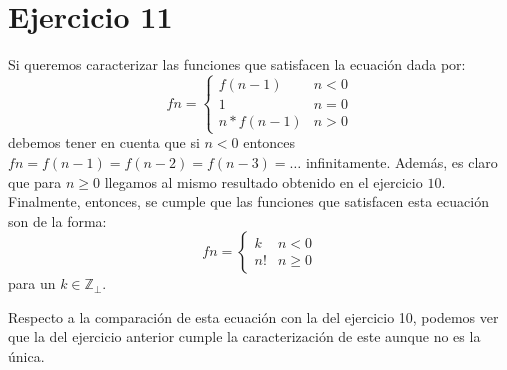 \documentclass{article}
\newcommand{\Z}{\mathbb{Z}}
\begin{document}
\section*{Ejercicio 11}
Si queremos caracterizar las funciones que satisfacen la ecuación dada por:
\begin{equation*}
	f n = \begin{cases}
		f(n - 1)     & n < 0 \\
		1            & n = 0 \\
		n * f(n - 1) & n > 0
	\end{cases}
\end{equation*}
debemos tener en cuenta que si $n < 0$ entonces $f n = f(n-1) = f(n-2) = f(n-3) = \dots$ infinitamente.
Además, es claro que para $n \geq 0$ llegamos al mismo resultado obtenido en el ejercicio $10$.
Finalmente, entonces, se cumple que las funciones que satisfacen esta ecuación son de la forma:
\begin{equation*}
	f n = \begin{cases}
		k  & n < 0    \\
		n! & n \geq 0
	\end{cases}
\end{equation*}
para un $k \in \Z_\bot$.

Respecto a la comparación de esta ecuación con la del ejercicio 10, podemos ver que la del ejercicio anterior cumple la caracterización de este aunque no es la única.
\end{document}
